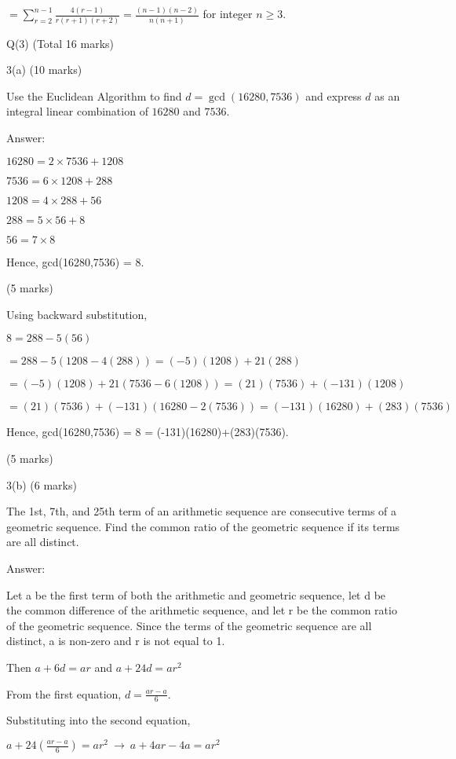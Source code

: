 \documentclass[a4paper,12pt,oneside]{book}
\theoremstyle{definition}
\begin{document}
$ = \sum_{r=2}^{n-1} \frac{4(r-1)}{r(r+1)(r+2)} = \frac{(n-1)(n-2)}{n(n+1)}$ for integer $n \geq 3$.







\newpage

Q(3) (Total 16 marks)

3(a) (10 marks)

Use the Euclidean Algorithm to find $d=\gcd(16280,7536)$ and express $d$ as an integral linear combination of $16280$ and $7536$.

Answer:

$16280 = 2 \times 7536 + 1208$

$7536 = 6 \times 1208 + 288$

$1208 = 4 \times 288 + 56$

$288 = 5 \times 56 + 8$

$56 = 7 \times 8$

Hence, gcd(16280,7536) = 8.

(5 marks)

Using backward substitution,

$8 = 288 - 5(56)$

$= 288 - 5(1208-4(288)) = (-5)(1208)+21(288)$

$= (-5)(1208)+21(7536-6(1208)) = (21)(7536) + (-131)(1208)$

$= (21)(7536) + (-131)(16280-2(7536)) = (-131)(16280)+(283)(7536)$

Hence, gcd(16280,7536) = 8 = (-131)(16280)+(283)(7536).

(5 marks)

3(b) (6 marks)

The 1st, 7th, and 25th term of an arithmetic sequence are consecutive terms of a geometric sequence. Find the common ratio of the geometric sequence if its terms are all distinct.

Answer:

Let a be the first term of both the arithmetic and geometric sequence, let d be the common difference of the arithmetic sequence, and let r be the common ratio of the geometric sequence. Since the terms of the geometric sequence are all distinct, a is non-zero and r is not equal to 1.

Then $a + 6d = ar$ and $a + 24d = ar^2$

From the first equation, $d = \frac{ar-a}{6}$.

Substituting into the second equation,

$a+24(\frac{ar-a}{6}) = ar^2 \ \longrightarrow \ a + 4ar - 4a = ar^2$ 
\end{document}
